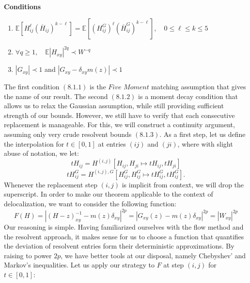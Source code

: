\documentclass[11pt]{article}
\newenvironment{boxt}[1]
  {\begin{mdframed}\noindent\textbf{#1}\normalfont\space}
  {\end{mdframed}}
\begin{document}
\begin{boxt}{Conditions}
\begin{enumerate}[label=(8.1.\arabic*),align=left, leftmargin=30pt, labelwidth=25pt, labelsep=5pt]\label{8.1.1}
\item $\mathbb{E}\left[H_{ij}^\ell \left(\overline{H}_{ij}\right)^{k-\ell}\right] = \mathbb{E}\left[\left(H_{ij}^G\right)^\ell \left(\overline{H}_{ij}^G\right)^{k-\ell}\right], \quad 0\leq \ell\leq k\leq 5$\label{8.1.2}
\item $\forall q\geq 1, \quad \mathbb{E}\left\vert H_{xy}\right\vert ^{2q}\prec W^{-q}$
\item $|G_{xy}|\prec 1$ and $|G_{xy}-\delta_{xy}m(z)|\prec 1$ \label{8.1.3}
\end{enumerate}
\end{boxt}
The first condition $(8.1.1)$ is the $\textit{Five Moment}$ matching assumption that gives the name of our result. The second $(8.1.2)$ is a moment decay condition that allows us to relax the Gaussian assumption, while still providing sufficient strength of our bounds. However, we still have to verify that each consecutive replacement is manageable. For this, we will construct a continuity argument, assuming only very crude resolvent bounds $(8.1.3)$. As a first step, let us define the interpolation for $t\in [0, 1]$ at entries $(ij)$ and $(ji)$, where with slight abuse of notation, we let:
$$tH_{ij} = H^{(i, j)}[H_{ij}, H_{ji}\mapsto t H_{ij}, tH_{ji}]$$
$$tH_{ij}^{G} = H^{(i, j),G}[H^G_{ij}, H^G_{ij}\mapsto t H^G_{ij}, t H^{G}_{ij}].$$
Whenever the replacement step $(i, j)$ is implicit from context, we will drop the superscript. In order to make our theorem applicable to the context of delocalization, we want to consider the following function: 
\begin{equation*}\label{8.3}
F(H) = \left\vert
(H-z)_{xy}^{-1} - m(z)\delta_{xy}
\right\vert ^{2p} = \left\vert 
G_{xy}(z)-m(z)\delta_{xy}
\right\vert ^{2p} = |W_{xy}|^{2p}\tag{8.3}
\end{equation*}
Our reasoning is simple. Having familiarized ourselves with the flow method and the resolvent approach, it makes sense for us to choose a function that quantifies the deviation of resolvent entries form their deterministic approximations. By raising to power $2p$, we have better tools at our disposal, namely Chebyshev' and Markov's inequalities. Let us apply our strategy to $F$ at step $(i,j)$ for $t\in [0, 1]$: 
\end{document}
